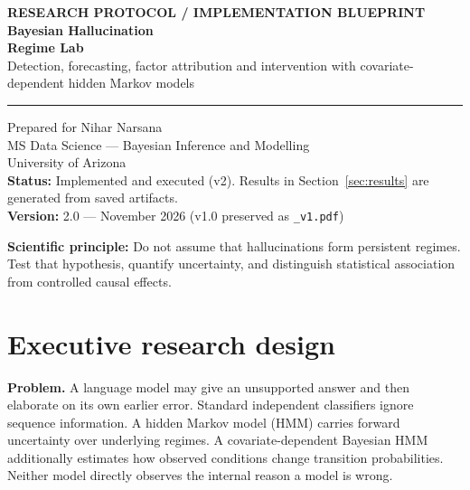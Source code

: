 \documentclass[11pt,letterpaper]{article}
\newcommand{\sectionpage}[1]{\clearpage\section{#1}}
\begin{document}
\begin{titlepage}
\color{navy}
\vspace*{1.2cm}
{\Large\textbf{RESEARCH PROTOCOL / IMPLEMENTATION BLUEPRINT}}\\[1cm]
{\Huge\bfseries Bayesian Hallucination\\ Regime Lab}\\[.5cm]
{\LARGE Detection, forecasting, factor attribution and intervention with covariate-dependent hidden Markov models}\\[1cm]
\rule{\linewidth}{2pt}
\vspace{.6cm}

{\large Prepared for Nihar Narsana\\ MS Data Science --- Bayesian Inference and Modelling\\ University of Arizona}\\[.7cm]
\textbf{Status:} Implemented and executed (v2). Results in Section~\ref{sec:results} are generated from saved artifacts.\\
\textbf{Version:} 2.0 --- November 2026 (v1.0 preserved as \texttt{\_v1.pdf})

\vfill
{}

\vspace{.5cm}
\textbf{Scientific principle:} Do not assume that hallucinations form persistent regimes. Test that hypothesis, quantify uncertainty, and distinguish statistical association from controlled causal effects.
\end{titlepage}
\tableofcontents
\sectionpage{Executive research design}
\textbf{Problem.} A language model may give an unsupported answer and then elaborate on its own earlier error. Standard independent classifiers ignore sequence information. A hidden Markov model (HMM) carries forward uncertainty over underlying regimes. A covariate-dependent Bayesian HMM additionally estimates how observed conditions change transition probabilities. Neither model directly observes the internal reason a model is wrong.
\end{document}
